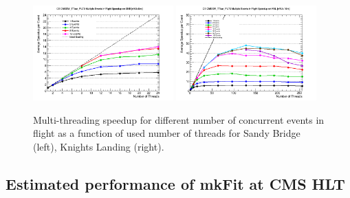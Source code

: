\documentclass{webofc}
\def\mkfit{mkFit\xspace}
\def\twop{0.48\textwidth}
\def\postfigskip{\vskip-4mm}
\begin{document}
\begin{figure}[htb]
  \centering
  \includegraphics[width=\twop]{figs/comp/SNB_CMSSW_TTbar_PU70_CE_MEIF_speedup.png}
  \hfill
  \includegraphics[width=\twop]{figs/comp/KNL_CMSSW_TTbar_PU70_CE_MEIF_speedup.png}
  \postfigskip

  \caption{Multi-threading speedup for different number of concurrent events
    in flight as a function of used number of threads for Sandy Bridge (left),
    Knights Landing (right).}
  \label{fig:meif-speedup}
\end{figure}


\subsection{Estimated performance of \mkfit at CMS HLT}
\end{document}

